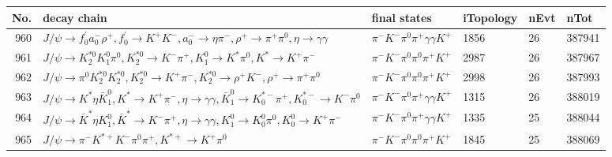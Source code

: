 \begin{table}[htbp] 
\begin{center}
\begin{small}
\begin{tabular}{rlllll}\hline\hline
 No. & decay chain & final states &  iTopology & nEvt & nTot \\\hline
960&$J/\psi       \rightarrow f^{'}_{0}     a_{0}^{-}      \rho^{+}      , f^{'}_{0}      \rightarrow K^{+}          K^{-}          , a_{0}^{-}       \rightarrow \eta          \pi^{-}        , \rho^{+}       \rightarrow \pi^{+}        \pi^{0}        , \eta           \rightarrow \gamma       \gamma       $&$\pi^{-}        K^{-}          \pi^{0}        \pi^{+}        \gamma       \gamma       K^{+}          $& 1856&   26&387941\\
961&$J/\psi       \rightarrow K_2^{*0}       K_1^{0}        \pi^{0}        , K_2^{*0}        \rightarrow K^{-}          \pi^{+}        , K_1^{0}         \rightarrow K^{*}          \pi^{0}        , K^{*}           \rightarrow K^{+}          \pi^{-}        $&$\pi^{-}        K^{-}          \pi^{0}        \pi^{0}        \pi^{+}        K^{+}          $& 2987&   26&387967\\
962&$J/\psi       \rightarrow \pi^{0}        K_2^{*0}       K_2^{*0}       , K_2^{*0}        \rightarrow K^{+}          \pi^{-}        , K_2^{*0}        \rightarrow \rho^{+}      K^{-}          , \rho^{+}       \rightarrow \pi^{+}        \pi^{0}        $&$\pi^{-}        K^{-}          \pi^{0}        \pi^{0}        \pi^{+}        K^{+}          $& 2998&   26&387993\\
963&$J/\psi       \rightarrow K^{*}          \eta          \bar{K}_1^{0} , K^{*}           \rightarrow K^{+}          \pi^{-}        , \eta           \rightarrow \gamma       \gamma       , \bar{K}_1^{0}  \rightarrow K_{0}^{*-}     \pi^{+}        , K_{0}^{*-}      \rightarrow K^{-}          \pi^{0}        $&$\pi^{-}        K^{-}          \pi^{0}        \pi^{+}        \gamma       \gamma       K^{+}          $& 1315&   26&388019\\
964&$J/\psi       \rightarrow \bar{K}^{*}   \eta          K_1^{0}        , \bar{K}^{*}    \rightarrow K^{-}          \pi^{+}        , \eta           \rightarrow \gamma       \gamma       , K_1^{0}         \rightarrow K_0^{0}        \pi^{0}        , K_0^{0}         \rightarrow K^{+}          \pi^{-}        $&$\pi^{-}        K^{-}          \pi^{0}        \pi^{+}        \gamma       \gamma       K^{+}          $& 1335&   25&388044\\
965&$J/\psi       \rightarrow \pi^{-}        K^{*+}         K^{-}          \pi^{0}        \pi^{+}        , K^{*+}          \rightarrow K^{+}          \pi^{0}        $&$\pi^{-}        K^{-}          \pi^{0}        \pi^{0}        \pi^{+}        K^{+}          $& 1845&   25&388069\\

\end{tabular}
\end{small}
\end{center}
\end{table}
